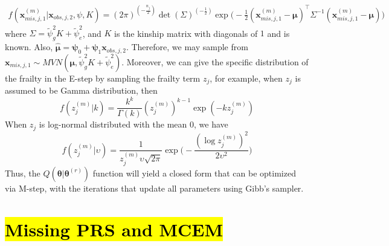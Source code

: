 \documentclass[preprint,12pt]{elsarticle}
\begin{document}
\begin{align} 
    f(\mathbf{x}_{mis,j,1}^{(m)}|\mathbf{x}_{obs,j,2}, \psi, K)=(2\pi)^{(-\frac{n_j}{2})}\det (\Sigma)^{(-\frac{1}{2})}\exp \big( -\frac{1}{2}(\mathbf{x}_{mis,j,1}^{(m)}-\boldsymbol{\mu})^{\top}\Sigma^{-1}(\mathbf{x}_{mis,j,1}^{(m)}-\boldsymbol{\mu})\Big )
\end{align}
where $\Sigma = \tilde{\psi}_g^2 K + \tilde{\psi}_e^2$, and $K$ is the kinship matrix with diagonals of $1$ and is known. 
Also, $\hat{\boldsymbol{\mu}}=\boldsymbol{\psi}_0+\boldsymbol{\psi}_1 \mathbf{x}_{obs,j,2}$. Therefore, we may sample from $\mathbf{x}_{mis,j,1}\sim MVN(\boldsymbol{\mu}, \tilde{\psi}_g^2K+\tilde{\psi}_e^2)$. Moreover, we can give the specific distribution of the frailty in the E-step by sampling the frailty term $z_j$, for example, when $z_j$ is assumed to be Gamma distribution, then 
\begin{equation} 
    f(z_j^{(m)}|k)=\frac{k^k}{\Gamma (k)}(z_j^{(m)})^{k-1}\exp (-kz_j^{(m)})
\end{equation}
When $z_j$ is log-normal distributed with the mean 0, we have 
\begin{equation}
    f(z_j^{(m)}|\upsilon)=\frac{1}{z_j^{(m)}\upsilon\sqrt{2\pi}}\exp\Big (-\frac{(\log z_j^{(m)})^2}{2\upsilon^2}\Big )
\end{equation}
Thus, the $Q(\boldsymbol{\theta}|\boldsymbol{\theta}^{(r)})$ function will yield a closed form that can be optimized via M-step, with the iterations that update all parameters using Gibb's sampler. 

\section{\hl{Missing PRS and MCEM}}\label{sec:missingprs}
\end{document}
